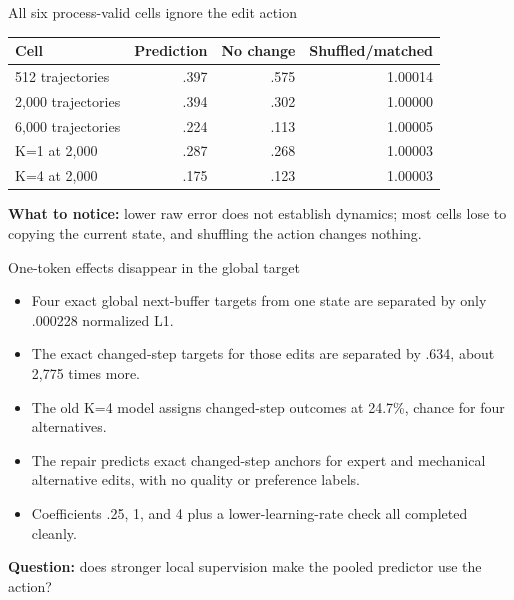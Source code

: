 \documentclass[aspectratio=169]{beamer}
\begin{document}
\begin{frame}{All six process-valid cells ignore the edit action}
  \centering
  \begin{tabular}{lrrr}
    \toprule
    Cell & Prediction & No change & Shuffled/matched \\
    \midrule
    512 trajectories & .397 & .575 & 1.00014 \\
    2,000 trajectories & .394 & .302 & 1.00000 \\
    6,000 trajectories & .224 & .113 & 1.00005 \\
    K=1 at 2,000 & .287 & .268 & 1.00003 \\
    K=4 at 2,000 & .175 & .123 & 1.00003 \\
    \bottomrule
  \end{tabular}
  \vfill
  \textbf{What to notice:} lower raw error does not establish dynamics; most cells lose to copying the current state, and shuffling the action changes nothing.
\end{frame}

\begin{frame}{One-token effects disappear in the global target}
  \begin{itemize}
    \item Four exact global next-buffer targets from one state are separated by only .000228 normalized L1.
    \item The exact changed-step targets for those edits are separated by .634, about 2,775 times more.
    \item The old K=4 model assigns changed-step outcomes at 24.7\%, chance for four alternatives.
    \item The repair predicts exact changed-step anchors for expert and mechanical alternative edits, with no quality or preference labels.
    \item Coefficients .25, 1, and 4 plus a lower-learning-rate check all completed cleanly.
  \end{itemize}
  \vfill
  \textbf{Question:} does stronger local supervision make the pooled predictor use the action?
\end{frame}
\end{document}

